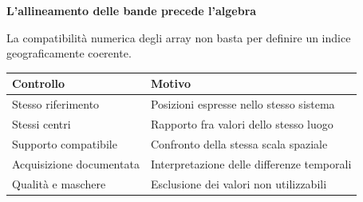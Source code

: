 \documentclass[12pt,aspectratio=1610]{beamer}
\newcommand{\PilotChrome}[4]{%
  \node[anchor=north west,inner sep=0,text width=17.7cm] at ([xshift=.95cm,yshift=-.55cm]current page.north west) {\color{Navy}\bfseries\fontsize{20.6}{24.5}\selectfont #1};
  \node[anchor=north east,inner sep=0] at ([xshift=19.05cm,yshift=-.14cm]current page.north west) {\color{Classical}\fontsize{8}{10}\selectfont\hyperlink{slide2}{#2}};
  \draw[Classical,line width=1.2pt] ([xshift=.95cm,yshift=-1.7cm]current page.north west)--([xshift=2.35cm,yshift=-1.7cm]current page.north west);
  \draw[Rule,line width=.65pt] ([xshift=.95cm,yshift=-10.36cm]current page.north west)--([xshift=19.05cm,yshift=-10.36cm]current page.north west);
  \node[anchor=north west,inner sep=0] at ([xshift=.96cm,yshift=-10.55cm]current page.north west) {\color{Classical}\bfseries\fontsize{9.1}{12}\selectfont DA RICORDARE};
  \node[anchor=north west,inner sep=0,text width=14.3cm] at ([xshift=4.2cm,yshift=-10.53cm]current page.north west) {\color{Ink}\fontsize{10.3}{13.8}\selectfont #4};
  \draw[Rule,line width=.35pt] ([xshift=.95cm,yshift=-11.92cm]current page.north west)--([xshift=19.05cm,yshift=-11.92cm]current page.north west);
  \node[anchor=north west,inner sep=0] at ([xshift=.95cm,yshift=-12.06cm]current page.north west) {\color{Muted}\fontsize{7.7}{9.2}\selectfont Tessera: raster e morfometria};
  \node[anchor=north east,inner sep=0] at ([xshift=19.05cm,yshift=-12.06cm]current page.north west) {\color{Muted}\fontsize{7.7}{9.2}\selectfont #3/110};
}
\begin{document}
\begin{frame}[plain]
\end{frame}

\begin{frame}[plain]\hypertarget{slide83}{}
\begin{lrbox}{\TitleBox}
\begin{minipage}[t]{17.7cm}\raggedright\color{Ink}\fontsize{11.3}{14.8}\selectfont
\color{Navy}\bfseries\fontsize{20.6}{24.5}\selectfont L’allineamento delle bande precede l’algebra
\end{minipage}\end{lrbox}

\begin{lrbox}{\RecallBox}
\begin{minipage}[t]{14.3cm}\raggedright\color{Ink}\fontsize{11.3}{14.8}\selectfont
\fontsize{10.3}{13.8}\selectfont La compatibilità numerica degli array non basta per definire un indice geograficamente coerente.
\end{minipage}\end{lrbox}

\begin{lrbox}{\PilotLeftBox}
\begin{minipage}[t]{10.05cm}\raggedright\color{Ink}\fontsize{11.3}{14.8}\selectfont
{\fontsize{10.2}{13.1}\selectfont\renewcommand{\arraystretch}{1.45}\begin{tabular}{@{}p{4.0cm}p{5.0cm}@{}}\toprule
\textbf{Controllo} & \textbf{Motivo}\\\midrule
Stesso riferimento & Posizioni espresse nello stesso sistema\\
Stessi centri & Rapporto fra valori dello stesso luogo\\
Supporto compatibile & Confronto della stessa scala spaziale\\
Acquisizione documentata & Interpretazione delle differenze temporali\\
Qualità e maschere & Esclusione dei valori non utilizzabili\\
\bottomrule\end{tabular}}


\end{minipage}
\end{lrbox}
\end{frame}
\end{document}

